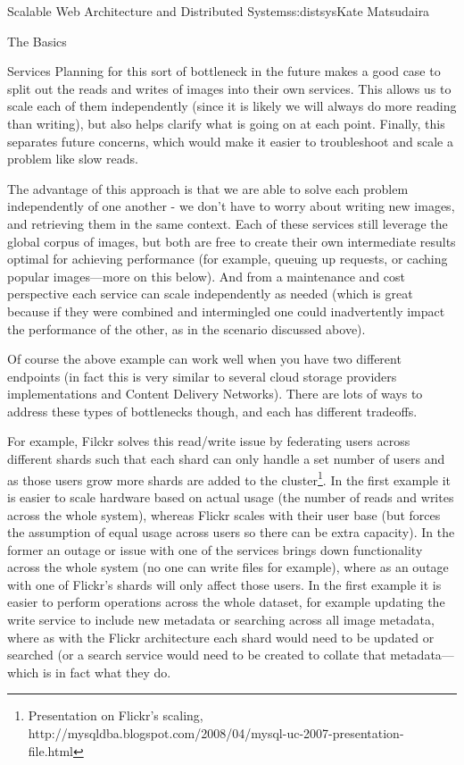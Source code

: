 \begin{aosachapter}{Scalable Web Architecture and Distributed Systems}{s:distsys}{Kate Matsudaira}
\begin{aosasect1}{The Basics}
\begin{aosasect2}{Services}
Planning for this sort of bottleneck in the future makes a good case
to split out the reads and writes of images into their own
services. This allows us to scale each of them independently (since it
is likely we will always do more reading than writing), but also helps
clarify what is going on at each point. Finally, this separates future
concerns, which would make it easier to troubleshoot and scale a
problem like slow reads.


The advantage of this approach is that we are able to solve each
problem independently of one another - we don’t have to worry about
writing new images, and retrieving them in the same context. Each of
these services still leverage the global corpus of images, but both
are free to create their own intermediate results optimal for
achieving performance (for example, queuing up requests, or caching
popular images---more on this below). And from a maintenance and cost
perspective each service can scale independently as needed (which is
great because if they were combined and intermingled one could
inadvertently impact the performance of the other, as in the scenario
discussed above).

Of course the above example can work well when you have two different
endpoints (in fact this is very similar to several cloud storage
providers implementations and Content Delivery Networks). There are
lots of ways to address these types of bottlenecks though, and each
has different tradeoffs.

For example, Filckr solves this read/write issue by federating users
across different shards such that each shard can only handle a set
number of users and as those users grow more shards are added to the
cluster\footnote{Presentation on Flickr’s scaling,
  http://mysqldba.blogspot.com/2008/04/mysql-uc-2007-presentation-file.html}. In
the first example it is easier to scale hardware based on actual usage
(the number of reads and writes across the whole system), whereas
Flickr scales with their user base (but forces the assumption of equal
usage across users so there can be extra capacity). In the former an
outage or issue with one of the services brings down functionality
across the whole system (no one can write files for example), where as
an outage with one of Flickr’s shards will only affect those users. In
the first example it is easier to perform operations across the whole
dataset, for example updating the write service to include new
metadata or searching across all image metadata, where as with the
Flickr architecture each shard would need to be updated or searched
(or a search service would need to be created to collate that
metadata---which is in fact what they do.


\end{aosasect2}
\end{aosasect1}
\end{aosachapter}
